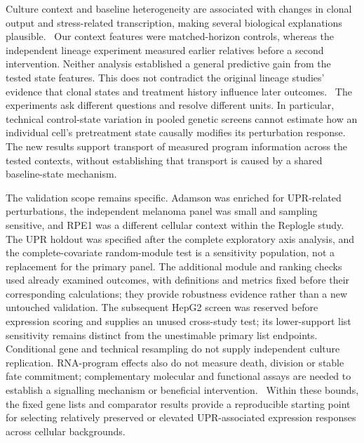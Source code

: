 \documentclass[a4paper,fleqn]{cas-sc}
\makeatletter
\DeclareRobustCommand{\rev}[1]{{\color{red}\def\@citecolor{black}\def\@linkcolor{red}\def\@urlcolor{red}#1}}
\let\unmarkedcite\cite
\renewcommand{\cite}[1]{{\color{black}\def\@citecolor{black}\unmarkedcite{#1}}}
\makeatother
\begin{document}
Culture context and baseline heterogeneity are associated with changes in clonal output and stress-related transcription, making several biological explanations plausible.~\cite{weinreb2020,lyu2026serum,lyu2026stress} \rev{Our context features were matched-horizon controls, whereas the independent lineage experiment measured earlier relatives before a second intervention.} \rev{Neither analysis established a general predictive gain from the tested state features.} \rev{This does not contradict the original lineage studies' evidence that clonal states and treatment history influence later outcomes.~\cite{weinreb2020,schaff2024}} \rev{The experiments ask different questions and resolve different units.} \rev{In particular, technical control-state variation in pooled genetic screens cannot estimate how an individual cell's pretreatment state causally modifies its perturbation response.} \rev{The new results support transport of measured program information across the tested contexts, without establishing that transport is caused by a shared baseline-state mechanism.}

\rev{The validation scope remains specific.} \rev{Adamson was enriched for UPR-related perturbations, the independent melanoma panel was small and sampling sensitive, and RPE1 was a different cellular context within the Replogle study.} \rev{The UPR holdout was specified after the complete exploratory axis analysis, and the complete-covariate random-module test is a sensitivity population, not a replacement for the primary panel.} \rev{The additional module and ranking checks used already examined outcomes, with definitions and metrics fixed before their corresponding calculations; they provide robustness evidence rather than a new untouched validation.} \rev{The subsequent HepG2 screen was reserved before expression scoring and supplies an unused cross-study test; its lower-support list sensitivity remains distinct from the unestimable primary list endpoints.} \rev{Conditional gene and technical resampling do not supply independent culture replication.} \rev{RNA-program effects also do not measure death, division or stable fate commitment; complementary molecular and functional assays are needed to establish a signalling mechanism or beneficial intervention.~\cite{adamson2016,replogle2022,cahan2014,rackham2016}} \rev{Within these bounds, the fixed gene lists and comparator results provide a reproducible starting point for selecting relatively preserved or elevated UPR-associated expression responses across cellular backgrounds.}
\end{document}

